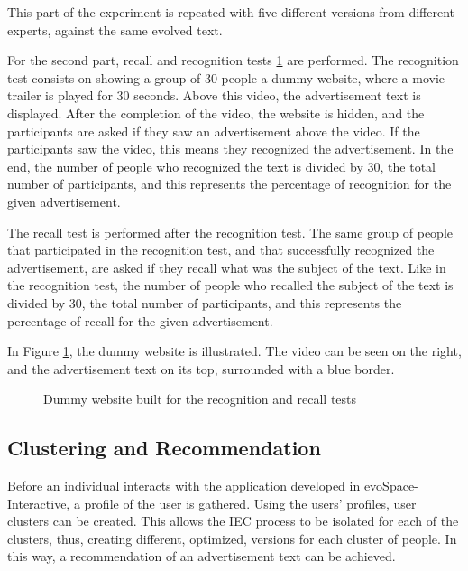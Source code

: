 \documentclass{acm_proc_article-sp}
\begin{document}
This part of the experiment is repeated with five different versions
from different experts, against the same evolved text.

For the second part, recall and recognition tests
\ref{RecallRecognition} are performed. The recognition test consists
on showing a group of 30 people a dummy website, where a movie trailer
is played for 30 seconds. Above this video, the advertisement text is
displayed. After the completion of the video, the website is hidden,
and the participants are asked if they saw an advertisement above the
video. If the participants saw the video, this means they recognized
the advertisement. In the end, the number of people who recognized the
text is divided by 30, the total number of participants, and this
represents the percentage of recognition for the given advertisement.

The recall test is performed after the recognition test. The same
group of people that participated in the recognition test, and that
successfully recognized the advertisement, are asked if they recall
what was the subject of the text. Like in the recognition test, the
number of people who recalled the subject of the text is divided by
30, the total number of participants, and this represents the
percentage of recall for the given advertisement.

In Figure \ref{RecallRecognition}, the dummy website is
illustrated. The video can be seen on the right, and the advertisement
text on its top, surrounded with a blue border.

\begin{figure}
  \centering
  \caption{Dummy website built for the recognition and recall tests}
  \label{RecallRecognition}
\end{figure}

\subsection{Clustering and Recommendation}
\label{ClusteringRecommendation}

Before an individual interacts with the application developed in
evoSpace-Interactive, a profile of the user is gathered. Using the
users' profiles, user clusters can be created. This allows the IEC
process to be isolated for each of the clusters, thus, creating
different, optimized, versions for each cluster of people. In this
way, a recommendation of an advertisement text can be achieved.
\end{document}
